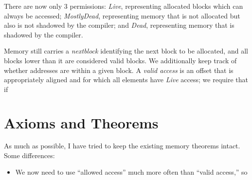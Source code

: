 \documentclass{article}
\begin{document}
There are now only 3 permissions:
{\it Live}, representing allocated blocks which can always be accessed;
{\it MostlyDead}, representing memory that is not allocated but also is
not shadowed by the compiler; and
{\it Dead}, representing memory that is shadowed by the compiler.

Memory still carries a {\it nextblock} identifying the next block to be allocated,
and all blocks lower than it are considered valid blocks. We additionally keep track
of whether addresses are within a given block. A {\it valid access} is an offset that
is appropriately aligned and for which all elements have {\it Live} access; we require
that if 



\section{Axioms and Theorems}

As much as possible, I have tried to keep the existing memory theorems intact.
Some differences:

\begin{itemize}
\item We now need to use ``allowed access'' much more often than ``valid access,'' so
  
\end{itemize}
\end{document}
